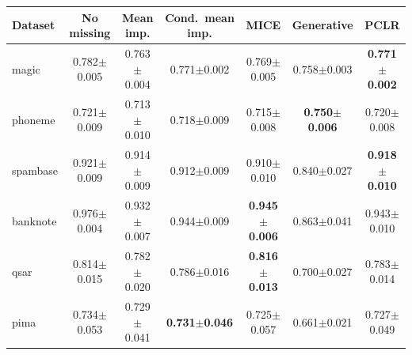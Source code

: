 \begin{tabular}{lcccccc}
\toprule
Dataset & No missing & Mean imp. & Cond.\ mean imp. & MICE & Generative & PCLR \\
\midrule
magic & 0.782{\scriptsize$\pm$0.005} & 0.763{\scriptsize$\pm$0.004} & 0.771{\scriptsize$\pm$0.002} & 0.769{\scriptsize$\pm$0.005} & 0.758{\scriptsize$\pm$0.003} & \textbf{0.771{\scriptsize$\pm$0.002}} \\
phoneme & 0.721{\scriptsize$\pm$0.009} & 0.713{\scriptsize$\pm$0.010} & 0.718{\scriptsize$\pm$0.009} & 0.715{\scriptsize$\pm$0.008} & \textbf{0.750{\scriptsize$\pm$0.006}} & 0.720{\scriptsize$\pm$0.008} \\
spambase & 0.921{\scriptsize$\pm$0.009} & 0.914{\scriptsize$\pm$0.009} & 0.912{\scriptsize$\pm$0.009} & 0.910{\scriptsize$\pm$0.010} & 0.840{\scriptsize$\pm$0.027} & \textbf{0.918{\scriptsize$\pm$0.010}} \\
banknote & 0.976{\scriptsize$\pm$0.004} & 0.932{\scriptsize$\pm$0.007} & 0.944{\scriptsize$\pm$0.009} & \textbf{0.945{\scriptsize$\pm$0.006}} & 0.863{\scriptsize$\pm$0.041} & 0.943{\scriptsize$\pm$0.010} \\
qsar & 0.814{\scriptsize$\pm$0.015} & 0.782{\scriptsize$\pm$0.020} & 0.786{\scriptsize$\pm$0.016} & \textbf{0.816{\scriptsize$\pm$0.013}} & 0.700{\scriptsize$\pm$0.027} & 0.783{\scriptsize$\pm$0.014} \\
pima & 0.734{\scriptsize$\pm$0.053} & 0.729{\scriptsize$\pm$0.041} & \textbf{0.731{\scriptsize$\pm$0.046}} & 0.725{\scriptsize$\pm$0.057} & 0.661{\scriptsize$\pm$0.021} & 0.727{\scriptsize$\pm$0.049} \\
\bottomrule
\end{tabular}
